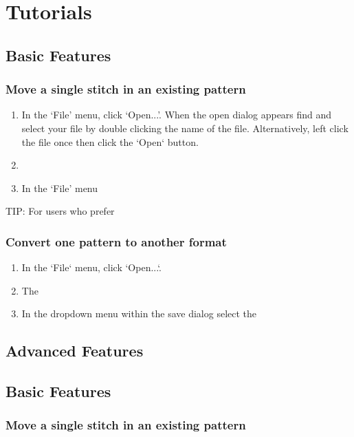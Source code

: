 
\chapter{Tutorials}

\section{Basic Features}

\subsection{Move a single stitch in an existing pattern}

\begin{enumerate}
\item In the `File' menu, click `Open...'. When the open dialog appears find
  and select your file by double clicking the name of the file. Alternatively,
  left click the file once then click the `Open` button.
\item
\item In the `File' menu
\end{enumerate}

TIP: For users who prefer

\subsection{Convert one pattern to another format}

\begin{enumerate}
\item In the `File` menu, click `Open...`.
\item The 
\item In the dropdown menu within the save dialog select the 
\end{enumerate}

\section{Advanced Features}


\section{Basic Features}

\subsection{Move a single stitch in an existing pattern}


